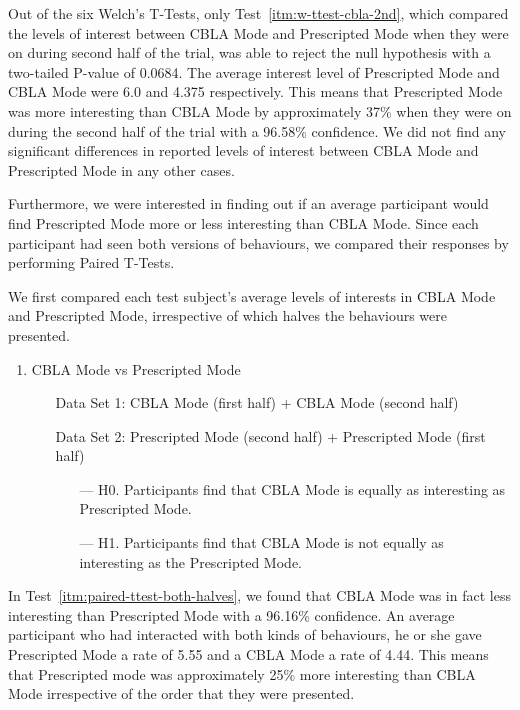 Out of the six Welch's T-Tests, only Test~\ref{itm:w-ttest-cbla-2nd}, which compared the levels of interest between CBLA Mode and Prescripted Mode when they were on during second half of the trial, was able to reject the null hypothesis with a two-tailed P-value of 0.0684. The average interest level of Prescripted Mode and CBLA Mode were 6.0 and 4.375 respectively. This means that Prescripted Mode was more interesting than CBLA Mode by approximately 37\% when they were on during the second half of the trial with a 96.58\% confidence. We did not find any significant differences in reported levels of interest between CBLA Mode and Prescripted Mode in any other cases.

Furthermore, we were interested in finding out if an average participant would find Prescripted Mode more or less interesting than CBLA Mode. Since each participant had seen both versions of behaviours, we compared their responses by performing Paired T-Tests. 

We first compared each test subject's average levels of interests in CBLA Mode and Prescripted Mode, irrespective of which halves the behaviours were presented. 
\begin{enumerate}[resume]
 	\item CBLA Mode vs Prescripted Mode
 	\begin{itemize}[align=left]\label{itm:paired-ttest-both-halves}
 		\item[Data Set 1: ]  CBLA Mode (first half) + CBLA Mode (second half)
 		\item[Data Set 2: ]  Prescripted Mode (second half) + Prescripted Mode (first half) 
 		\begin{itemize}
 			\item[--- H0.] Participants find that CBLA Mode is equally as interesting as Prescripted Mode.
 			\item[--- H1.] Participants find that CBLA Mode is not equally as interesting as the Prescripted Mode.
 		\end{itemize}
 	\end{itemize}
\end{enumerate}

In Test~\ref{itm:paired-ttest-both-halves}, we found that CBLA Mode was in fact less interesting than Prescripted Mode with a 96.16\% confidence. An average participant who had interacted with both kinds of behaviours, he or she gave Prescripted Mode a rate of 5.55 and a CBLA Mode a rate of 4.44. This means that Prescripted mode was approximately 25\% more interesting than CBLA Mode irrespective of the order that they were presented. 

